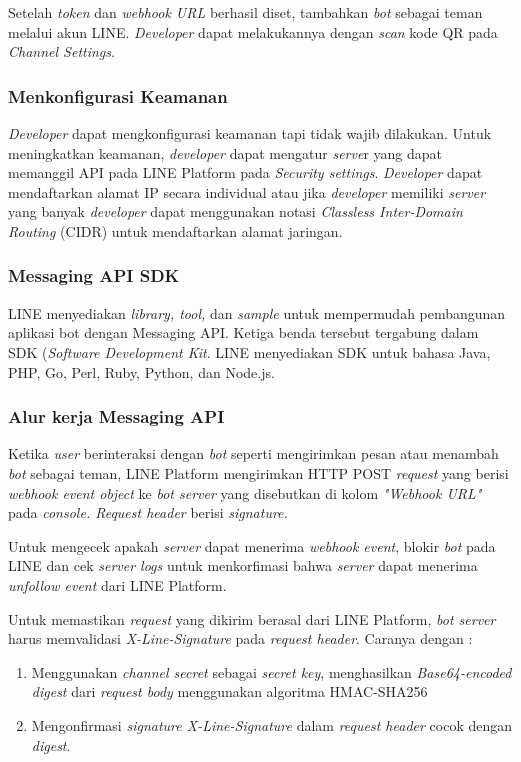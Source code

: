 Setelah \textit{token} dan \textit{webhook URL} berhasil diset, tambahkan \textit{bot} sebagai teman melalui akun LINE. \textit{Developer} dapat melakukannya dengan \textit{scan} kode QR pada \textit{Channel Settings}.

\subsubsection{Menkonfigurasi Keamanan}
\textit{Developer} dapat mengkonfigurasi keamanan tapi tidak wajib dilakukan. Untuk meningkatkan keamanan, \textit{developer} dapat mengatur \textit{serve}r yang dapat memanggil API pada LINE Platform pada \textit{Security settings}. \textit{Developer} dapat mendaftarkan alamat IP secara individual atau jika \textit{developer} memiliki \textit{server} yang banyak \textit{developer} dapat menggunakan notasi \textit{Classless Inter-Domain Routing} (CIDR) untuk mendaftarkan alamat jaringan.

\subsubsection{Messaging API SDK}
LINE menyediakan \textit{library, tool,} dan \textit{sample} untuk mempermudah pembangunan aplikasi bot dengan Messaging API. Ketiga benda tersebut tergabung dalam SDK (\textit{Software Development Kit}. LINE menyediakan SDK untuk bahasa Java, PHP, Go, Perl, Ruby, Python, dan Node.js.

\subsubsection{Alur kerja Messaging API}
Ketika \textit{user} berinteraksi dengan \textit{bot} seperti mengirimkan pesan atau menambah \textit{bot} sebagai teman, LINE Platform mengirimkan HTTP POST \textit{request} yang berisi \textit{webhook event object} ke \textit{bot server} yang disebutkan di kolom \textit{"Webhook URL"} pada \textit{console. Request header} berisi \textit{signature.} 

Untuk mengecek apakah \textit{server} dapat menerima \textit{webhook event}, blokir \textit{bot} pada LINE dan cek \textit{server logs} untuk menkorfimasi bahwa \textit{server} dapat menerima \textit{unfollow event} dari LINE Platform.

Untuk memastikan \textit{request} yang dikirim berasal dari LINE Platform, \textit{bot server} harus memvalidasi \textit{X-Line-Signature} pada \textit{request header}. Caranya dengan :
\begin{enumerate}
	\item Menggunakan \textit{channel secret} sebagai \textit{secret key}, menghasilkan \textit{Base64-encoded digest} dari \textit{request body} menggunakan algoritma HMAC-SHA256
	\item Mengonfirmasi \textit{signature X-Line-Signature} dalam \textit{request header} cocok dengan \textit{digest}.
\end{enumerate}

